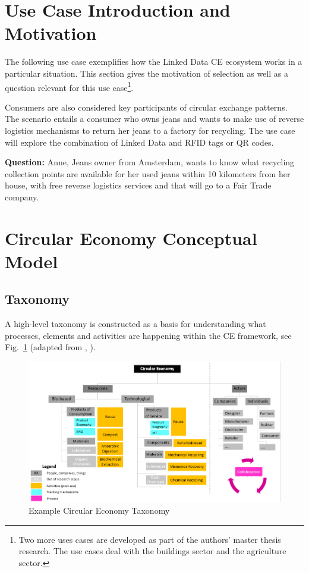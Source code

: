 \documentclass[runningheads,a4paper]{llncs}
\makeatletter
\def\maxwidth#1{\ifdim\Gin@nat@width>#1 #1\else\Gin@nat@width\fi}
\makeatother
\begin{document}
\section{Use Case Introduction and Motivation}

The following use case exemplifies how the Linked Data CE ecosystem works in a particular situation. This section gives the motivation of selection as well as a question relevant for this use case\footnote{ Two more uses cases are developed as part of the authors' master thesis research. The use cases deal with the buildings sector and the agriculture sector.}.

Consumers are also considered key participants of circular exchange patterns. The scenario entails a consumer who owns jeans and wants to make use of reverse logistics mechanisms to return her jeans to a factory for recycling. The use case will explore the combination of Linked Data and RFID tags or QR codes.

{\bf Question:} Anne, Jeans owner from Amsterdam, wants to know what recycling collection points are available for her used jeans within 10 kilometers from her house, with free reverse logistics services and that will go to a Fair Trade company. 

\section{Circular Economy Conceptual Model}

\subsection{Taxonomy}

A high-level taxonomy is constructed as a basis for understanding what processes, elements and activities are happening within the CE framework, see Fig.~\ref{_Ref488732938} (adapted from  \cite{_Ref490914724},  \cite{_Ref490914729}). 
\begin{figure}[h!]
\centering
\includegraphics[width=\maxwidth{\textwidth}]{./img/image1.png}
\cprotect\caption{Example Circular Economy Taxonomy}
\label{_Ref488732938}
\end{figure}
\end{document}
